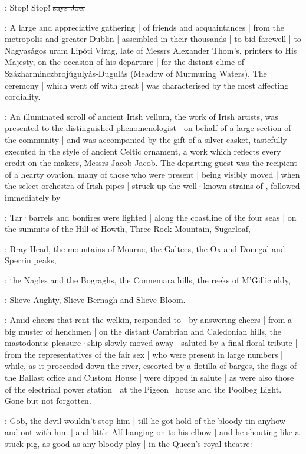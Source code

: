 \joe:
Stop!
Stop!
\sout{says Joe.}

:
A large and appreciative gathering |
of friends and acquaintances |
from the metropolis and greater Dublin |
assembled in their thousands |
to bid farewell |
to Nagyaságos uram Lipóti Virag,
late of Messrs Alexander Thom's,
printers to His Majesty,
on the occasion of his departure |
for the distant clime of Százharminczbrojúgulyás-Dugulás
(Meadow of Murmuring Waters).
The ceremony |
which went off with great  |
was characterised by the most affecting cordiality.%

:
An illuminated scroll of ancient Irish vellum,
the work of Irish artists,
was presented to the distinguished phenomenologist |
on behalf of a large section of the community |
and was accompanied by the gift of a silver casket,
tastefully executed in the style of ancient Celtic ornament,
a work which reflects every credit on the makers,
Messrs Jacob  Jacob.
The departing guest was the recipient of a hearty ovation,
many of those who were present |
being visibly moved |
when the select orchestra of Irish pipes |
struck up the well·known strains of ,
followed immediately by 

:
Tar·barrels and bonfires were lighted |
along the coastline of the four seas |
on the summits of the Hill of Howth,
Three Rock Mountain,
Sugarloaf,

:
Bray Head,
the mountains of Mourne,
the Galtees,
the Ox and Donegal and Sperrin peaks,

:
the Nagles and the Bograghs,
the Connemara hills,
the reeks of M'Gillicuddy,

:
Slieve Aughty,
Slieve Bernagh
and Slieve Bloom.

:
Amid cheers that rent the welkin,
responded to |
by answering cheers |
from a big muster of henchmen |
on the distant Cambrian and Caledonian hills,
the mastodontic pleasure·ship slowly moved away |
saluted by a final floral tribute |
from the representatives of the fair sex |
who were present in large numbers |
while,
as it proceeded down the river,
escorted by a flotilla of barges,
the flags of the Ballast office and Custom House |
were dipped in salute |
as were also those of the electrical power station |
at the Pigeon·house and the Poolbeg Light.
Gone but not forgotten.

\Nq:
Gob,
the devil wouldn't stop him |
till he got hold of the bloody tin anyhow |
and out with him |
and little Alf hanging on to his elbow |
and he shouting like a stuck pig,
as good as any bloody play |
in the Queen's royal theatre:

